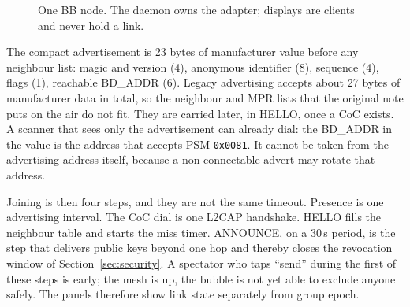 \documentclass[conference,10pt]{IEEEtran}
\begin{document}
\begin{figure}[t]
\centering
{}
\caption{One BB node. The daemon owns the adapter; displays are clients
and never hold a link.}
\label{fig:arch}
\end{figure}

The compact advertisement is 23 bytes of manufacturer value before any
neighbour list: magic and version (4), anonymous identifier (8),
sequence (4), flags (1), reachable BD\_ADDR (6). Legacy advertising
accepts about 27 bytes of manufacturer data in total, so the neighbour
and MPR lists that the original note puts on the air do not fit. They
are carried later, in HELLO, once a CoC exists. A scanner that sees only
the advertisement can already dial: the BD\_ADDR in the value is the
address that accepts PSM \texttt{0x0081}. It cannot be taken from the
advertising address itself, because a non-connectable advert may rotate
that address.

Joining is then four steps, and they are not the same timeout. Presence
is one advertising interval. The CoC dial is one L2CAP handshake. HELLO
fills the neighbour table and starts the miss timer. ANNOUNCE, on a
30\,s period, is the step that delivers public keys beyond one hop and
thereby closes the revocation window of Section~\ref{sec:security}. A
spectator who taps ``send'' during the first of these steps is early;
the mesh is up, the bubble is not yet able to exclude anyone safely.
The panels therefore show link state separately from group epoch.
\end{document}
